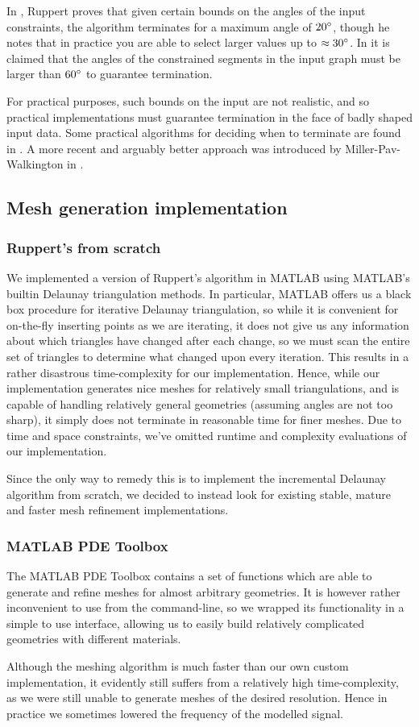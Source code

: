 \documentclass[10pt,a4paper]{article}
\begin{document}
In \cite{ruppert}, Ruppert proves that given certain bounds on the angles of the input constraints, the algorithm terminates for a maximum angle of $20 \degree$, though he notes that in practice you are able to select larger values up to $\approx 30 \degree$. In \cite{shewchuk} it is claimed that the angles of the constrained segments in the input graph must be larger than $60 \degree$ to guarantee termination.

For practical purposes, such bounds on the input are not realistic, and so practical implementations must guarantee termination in the face of badly shaped input data. Some practical algorithms for deciding when to terminate are found in \cite{shewchuk}. A more recent and arguably better approach was introduced by Miller-Pav-Walkington in \cite{miller}.

\subsection*{Mesh generation implementation}
\subsubsection*{Ruppert's from scratch}
We implemented a version of Ruppert's algorithm in MATLAB using MATLAB's builtin Delaunay triangulation methods. In particular, MATLAB offers us a black box procedure for iterative Delaunay triangulation, so while it is convenient for on-the-fly inserting points as we are iterating, it does not give us any information about which triangles have changed after each change, so we must scan the entire set of triangles to determine what changed upon every iteration. This results in a rather disastrous time-complexity for our implementation.
Hence, while our implementation generates nice meshes for relatively small triangulations, and is capable of handling relatively general geometries (assuming angles are not too sharp), it simply does not terminate in reasonable time for finer meshes. Due to time and space constraints, we've omitted runtime and complexity evaluations of our implementation. 

Since the only way to remedy this is to implement the incremental Delaunay algorithm from scratch, we decided to instead look for existing stable, mature and faster mesh refinement implementations.

\subsubsection*{MATLAB PDE Toolbox}
The MATLAB PDE Toolbox contains a set of functions which are able to generate and refine meshes for almost arbitrary geometries. It is however rather inconvenient to use from the command-line, so we wrapped its functionality in a simple to use interface, allowing us to easily build relatively complicated geometries with different materials.

Although the meshing algorithm is much faster than our own custom implementation, it evidently still suffers from a relatively high time-complexity, as we were still unable to generate meshes of the desired resolution. Hence in practice we sometimes lowered the frequency of the modelled signal.
\end{document}

